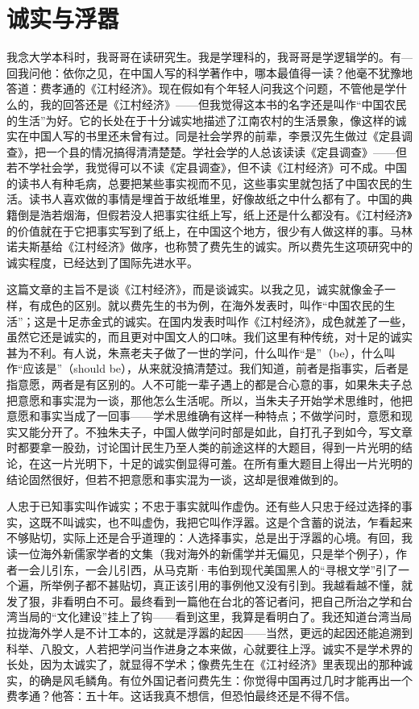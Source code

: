\chapter{诚实与浮嚣}

我念大学本科时，我哥哥在读研究生。我是学理科的，我哥哥是学逻辑学的。有—回我问他：依你之见，在中国人写的科学著作中，哪本最值得一读？他毫不犹豫地答道：费孝通的《江村经济》。现在假如有个年轻人问我这个问题，不管他是学什么的，我的回答还是《江村经济》——但我觉得这本书的名字还是叫作“中国农民的生活”为好。它的长处在于十分诚实地描述了江南农村的生活景象，像这样的诚实在中国人写的书里还未曾有过。同是社会学界的前辈，李景汉先生做过《定县调查》，把一个县的情况搞得清清楚楚。学社会学的人总该读读《定县调查》——但若不学社会学，我觉得可以不读《定县调查》，但不读《江村经济》可不成。中国的读书人有种毛病，总要把某些事实视而不见，这些事实里就包括了中国农民的生活。读书人喜欢做的事情是埋首于故纸堆里，好像故纸之中什么都有了。中国的典籍倒是浩若烟海，但假若没人把事实往纸上写，纸上还是什么都没有。《江村经济》的价值就在于它把事实写到了纸上，在中国这个地方，很少有人做这样的事。马林诺夫斯基给《江村经济》做序，也称赞了费先生的诚实。所以费先生这项研究中的诚实程度，已经达到了国际先进水平。 

这篇文章的主旨不是谈《江村经济》，而是谈诚实。以我之见，诚实就像金子一样，有成色的区别。就以费先生的书为例，在海外发表时，叫作“中国农民的生活”；这是十足赤金式的诚实。在国内发表时叫作《江村经济》，成色就差了一些，虽然它还是诚实的，而且更对中国文人的口味。我们这里有种传统，对十足的诚实甚为不利。有人说，朱熹老夫子做了一世的学问，什么叫作“是”（be），什么叫作“应该是”（should be），从来就没搞清楚过。我们知道，前者是指事实，后者是指意愿，两者是有区别的。人不可能一辈子遇上的都是合心意的事，如果朱夫子总把意愿和事实混为一谈，那他怎么生活呢。所以，当朱夫子开始学术思维时，他把意愿和事实当成了一回事——学术思维确有这样一种特点；不做学问时，意愿和现实又能分开了。不独朱夫子，中国人做学问时部是如此，自打孔子到如今，写文章时都要拿一股劲，讨论国计民生乃至人类的前途这样的大题目，得到一片光明的结论，在这一片光明下，十足的诚实倒显得可羞。在所有重大题目上得出一片光明的结论固然很好，但若不把意愿和事实混为一谈，这却是很难做到的。 

人忠于已知事实叫作诚实；不忠于事实就叫作虚伪。还有些人只忠于经过选择的事实，这既不叫诚实，也不叫虚伪，我把它叫作浮嚣。这是个含蓄的说法，乍看起来不够贴切，实际上还是合乎道理的：人选择事实，总是出于浮嚣的心境。有回，我读一位海外新儒家学者的文集（我对海外的新儒学并无偏见，只是举个例子），作者一会儿引东，一会儿引西，从马克斯·韦伯到现代美国黑人的“寻根文学”引了一个遍，所举例子都不甚贴切，真正该引用的事例他又没有引到。我越看越不懂，就发了狠，非看明白不可。最终看到一篇他在台北的答记者问，把自己所治之学和台湾当局的“文化建设”挂上了钩——看到这里，我算是看明白了。我还知道台湾当局拉拢海外学人是不计工本的，这就是浮嚣的起因——当然，更远的起因还能追溯到科举、八股文，人若把学问当作进身之本来做，心就要往上浮。诚实不是学术界的长处，因为太诚实了，就显得不学术；像费先生在《江衬经济》里表现出的那种诚实，的确是风毛鳞角。有位外国记者问费先生：你觉得中国再过几时才能再出一个费孝通？他答：五十年。这话我真不想信，但恐怕最终还是不得不信。


